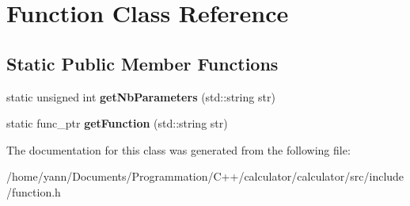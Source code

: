 \hypertarget{class_function}{\section{Function Class Reference}
\label{class_function}
}
\subsection*{Static Public Member Functions}
\begin{DoxyCompactItemize}
\item 
\hypertarget{class_function_af94043af6732cf11fb8210d1f79ad66a}{static unsigned int {\bfseries get\-Nb\-Parameters} (std\-::string str)}\label{class_function_af94043af6732cf11fb8210d1f79ad66a}

\item 
\hypertarget{class_function_a729042286d2b314dd4f5f5bb1394f4f0}{static func\-\_\-ptr {\bfseries get\-Function} (std\-::string str)}\label{class_function_a729042286d2b314dd4f5f5bb1394f4f0}

\end{DoxyCompactItemize}


The documentation for this class was generated from the following file\-:\begin{DoxyCompactItemize}
\item 
/home/yann/\-Documents/\-Programmation/\-C++/calculator/calculator/src/include/function.\-h\end{DoxyCompactItemize}
